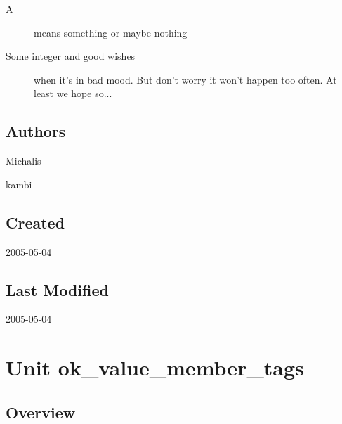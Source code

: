 \documentclass{report}
\begin{document}
\begin{list}{}
  \par
\item[\textbf{Parameters}]
\begin{description}
\item[A] means something or maybe nothing
\end{description}
\item[\textbf{Returns}]Some integer and good wishes
\item[\textbf{Exceptions}]
\begin{description}
\item[\begin{ttfamily}EBar\end{ttfamily}(\ref{ok_expanding_descriptions.EBar})] when it's in bad mood. But don't worry it won't happen too often. At least we hope so...
\end{description}


\end{list}
\section{Authors}
\par
Michalis

\par
kambi

\section{Created}
\par
2005{-}05{-}04


\section{Last Modified}
\par
2005{-}05{-}04


\chapter{Unit ok{\_}value{\_}member{\_}tags}
\section{Overview}
\begin{description}
\item[\texttt{\begin{ttfamily}TMyClass\end{ttfamily} Class}]  
\item[\texttt{\begin{ttfamily}TMyRecord\end{ttfamily} Record}]
\end{description}
\end{document}
